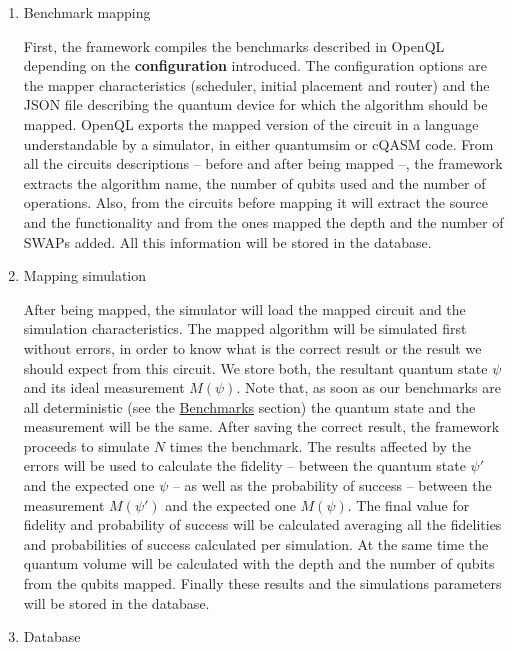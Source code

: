\begin{enumerate}
\item Benchmark mapping
\label{sec:orge67926f}

First, the framework compiles the benchmarks described in OpenQL depending on the \textbf{configuration} introduced.
The configuration options are the mapper characteristics (scheduler, initial placement and router) and the JSON file describing the quantum device for which the algorithm should be mapped.
OpenQL exports the mapped version of the circuit in a language understandable by a simulator, in either quantumsim or cQASM \cite{khammassi18} code.
From all the circuits descriptions -- before and after being mapped --, the framework extracts the algorithm name, the number of qubits used and the number of operations.
Also, from the circuits before mapping it will extract the source and the functionality and from the ones mapped the depth and the number of SWAPs added.
All this information will be stored in the database.

\item Mapping simulation
\label{sec:org033fd05}

After being mapped, the simulator will load the mapped circuit and the simulation characteristics.
The mapped algorithm will be simulated first without errors, in order to know what is the correct result or the result we should expect from this circuit.
We store both, the resultant quantum state \(\psi\) and its ideal measurement \(M(\psi)\).
Note that, as soon as our benchmarks are all deterministic (see the \hyperref[sec:orga02804b]{Benchmarks} section) the quantum state and the measurement will be the same.
After saving the correct result, the framework proceeds to simulate \(N\) times the benchmark.
The results affected by the errors will be used to calculate the fidelity -- between the quantum state \(\psi'\) and the expected one \(\psi\) -- as well as the probability of success -- between the measurement \(M(\psi')\) and the expected one \(M(\psi)\).
The final value for fidelity and probability of success will be calculated averaging all the fidelities and probabilities of success calculated per simulation.
At the same time the quantum volume will be calculated with the depth and the number of qubits from the qubits mapped.
Finally these results and the simulations parameters will be stored in the database.

\item Database
\label{sec:orgb5f5bb4}


\end{enumerate}
